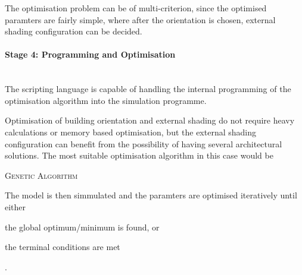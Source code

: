 The optimisation problem can be of multi-criterion, since the optimised paramters are fairly simple, where after the orientation is chosen, external shading configuration can be decided.

\paragraph{Stage 4: Programming and Optimisation}\mbox{}\\

The scripting language is capable of handling the internal programming of the optimisation algorithm into the simulation programme.

Optimisation of building orientation and external shading do not require heavy calculations or memory based optimisation, but the external shading configuration can benefit from the possibility of having several architectural solutions. The most suitable optimisation algorithm in this case would be 

\begin{compactenum}
\item \textsc{Genetic Algorithm}
\end{compactenum}

The model is then simmulated and the paramters are optimised iteratively until either \begin{inparaenum}[a)]\item the global optimum/minimum is found, or \item the terminal conditions are met\end{inparaenum}.
